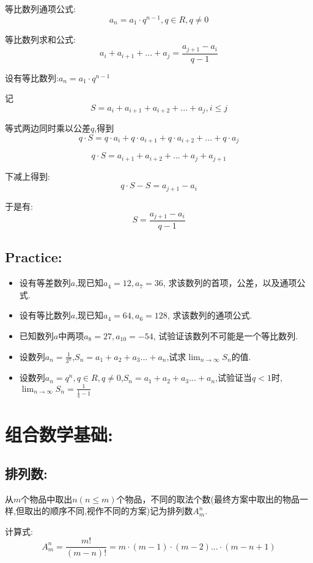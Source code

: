 \documentclass[UTF8]{article}
\begin{document}
等比数列通项公式:$$a_n = a_1\cdot q^{n-1}, q\in R, q\neq 0$$

等比数列求和公式:$$a_i + a_{i+1} + ... + a_j = \frac{a_{j+1} - a_i}{q - 1}$$

设有等比数列:$a_n = a_1\cdot q^{n-1}$

记$$S = a_i + a_{i+1} + a_{i+2} + ... + a_j, i \leq j$$

等式两边同时乘以公差$q$,得到
$$q\cdot S = q\cdot a_i + q\cdot a_{i+1} + q\cdot a_{i+2} + ... + q\cdot a_j$$

$$q\cdot S = a_{i+1} + a_{i+2} + ... + a_j + a_{j+1}$$

下减上得到:
$$q\cdot S - S = a_{j+1} - a_i$$

于是有:$$S = \frac{a_{j+1} - a_i}{q - 1}$$


\subsection{Practice:}

\begin{itemize}
	\item 设有等差数列$a$,现已知$a_4 = 12, a_7 = 36$, 求该数列的首项，公差，以及通项公式.
	\item 设有等比数列$a$,现已知$a_4 = 64, a_6 = 128$, 求该数列的通项公式.
	\item 已知数列$a$中两项$a_8 = 27, a_{10} = -54$, 试验证该数列不可能是一个等比数列.
	\item 设数列$a_n = \frac{1}{3^n}$,$S_n = a_1 + a_2 + a_3 ... + a_n$,试求$\lim_{n\to \infty} S_n$的值.
	\item 设数列$a_n = q^n, q\in R, q\neq 0$,$S_n = a_1 + a_2 + a_3 ... + a_n$,试验证当$q < 1$时,$\lim_{n\to \infty} S_n = \frac{1}{\frac{1}{q} - 1}$
\end{itemize}

\newpage

\section{组合数学基础:}

\subsection{排列数:}

从$m$个物品中取出$n(n\leq m)$个物品，不同的取法个数(最终方案中取出的物品一样,但取出的顺序不同,视作不同的方案)记为排列数$A_m^n$.

计算式:$$A_m^n = \frac{m!}{(m-n)!} = m\cdot (m-1)\cdot (m-2) ... \cdot(m-n+1)$$
\end{document}
